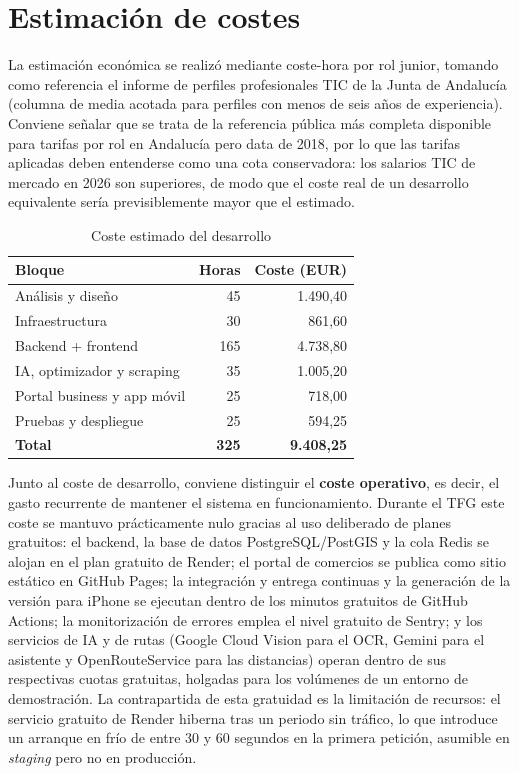 \section{Estimaci\'on de costes}

La estimaci\'on econ\'omica se realiz\'o mediante coste-hora por rol junior, tomando como
referencia el informe de perfiles profesionales TIC de la Junta de Andaluc\'ia
\cite{junta_perfiles_2018} (columna de media acotada para perfiles con menos de seis a\~nos
de experiencia). Conviene se\~nalar que se trata de la referencia p\'ublica m\'as completa
disponible para tarifas por rol en Andaluc\'ia pero data de 2018, por lo que las tarifas
aplicadas deben entenderse como una cota conservadora: los salarios TIC de mercado en 2026
son superiores, de modo que el coste real de un desarrollo equivalente ser\'ia previsiblemente
mayor que el estimado.

\begin{table}[htbp]
\centering
\caption{Coste estimado del desarrollo}
\label{tab:coste-estimado}
\begin{tabular}{@{}lrr@{}}
\toprule
\textbf{Bloque} & \textbf{Horas} & \textbf{Coste (EUR)} \\
\midrule
An\'alisis y dise\~no & 45 & 1.490,40 \\
Infraestructura & 30 & 861,60 \\
Backend + frontend & 165 & 4.738,80 \\
IA, optimizador y scraping & 35 & 1.005,20 \\
Portal business y app m\'ovil & 25 & 718,00 \\
Pruebas y despliegue & 25 & 594,25 \\
\midrule
\textbf{Total} & \textbf{325} & \textbf{9.408,25} \\
\bottomrule
\end{tabular}
\end{table}

Junto al coste de desarrollo, conviene distinguir el \textbf{coste operativo}, es decir, el gasto
recurrente de mantener el sistema en funcionamiento. Durante el TFG este coste se mantuvo
pr\'acticamente nulo gracias al uso deliberado de planes gratuitos: el backend, la base de datos
PostgreSQL/PostGIS y la cola Redis se alojan en el plan gratuito de Render; el portal de comercios
se publica como sitio est\'atico en GitHub Pages; la integraci\'on y entrega continuas y la
generaci\'on de la versi\'on para iPhone se ejecutan dentro de los minutos gratuitos de GitHub
Actions; la monitorizaci\'on de errores emplea el nivel gratuito de Sentry; y los servicios de IA y
de rutas (Google Cloud Vision para el OCR, Gemini para el asistente y OpenRouteService para las
distancias) operan dentro de sus respectivas cuotas gratuitas, holgadas para los vol\'umenes de un
entorno de demostraci\'on. La contrapartida de esta gratuidad es la limitaci\'on de recursos: el
servicio gratuito de Render hiberna tras un periodo sin tr\'afico, lo que introduce un arranque
en fr\'io de entre 30 y 60 segundos en la primera petici\'on, asumible en \emph{staging} pero no en
producci\'on.

